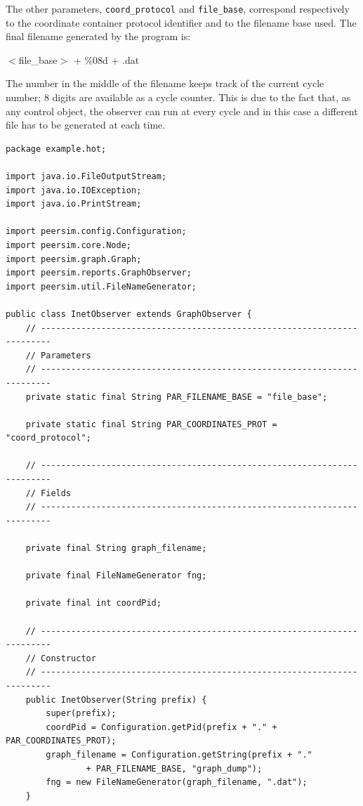 \documentclass[a4paper,11pt]{article}
\begin{document}
The other parameters, \texttt{coord\_protocol} and \texttt{file\_base},
correspond respectively to the coordinate container protocol
identifier and to the filename base used. 
The final filename generated by
the program is: 

\begin{center}
$<$file\_base$>$ + \%08d + .dat 
\end{center}

The number in the middle of the filename keeps track of the current
cycle number; 8 digits are available as a cycle counter. 
This is due to the fact that, as any control object, the
observer can run at every cycle and in this case a
different file has to be generated at each time. 

\footnotesize
\begin{verbatim}
package example.hot;

import java.io.FileOutputStream;
import java.io.IOException;
import java.io.PrintStream;

import peersim.config.Configuration;
import peersim.core.Node;
import peersim.graph.Graph;
import peersim.reports.GraphObserver;
import peersim.util.FileNameGenerator;

public class InetObserver extends GraphObserver {
    // ------------------------------------------------------------------------
    // Parameters
    // ------------------------------------------------------------------------
    private static final String PAR_FILENAME_BASE = "file_base";

    private static final String PAR_COORDINATES_PROT = "coord_protocol";

    // ------------------------------------------------------------------------
    // Fields
    // ------------------------------------------------------------------------

    private final String graph_filename;

    private final FileNameGenerator fng;

    private final int coordPid;

    // ------------------------------------------------------------------------
    // Constructor
    // ------------------------------------------------------------------------
    public InetObserver(String prefix) {
        super(prefix);
        coordPid = Configuration.getPid(prefix + "." + PAR_COORDINATES_PROT);
        graph_filename = Configuration.getString(prefix + "."
                + PAR_FILENAME_BASE, "graph_dump");
        fng = new FileNameGenerator(graph_filename, ".dat");
    }


\end{verbatim}
\end{document}
